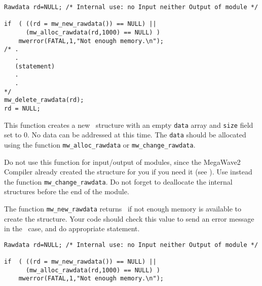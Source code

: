 \Next
\Example
\begin{verbatim}
Rawdata rd=NULL; /* Internal use: no Input neither Output of module */

if  ( ((rd = mw_new_rawdata()) == NULL) ||
      (mw_alloc_rawdata(rd,1000) == NULL) )
    mwerror(FATAL,1,"Not enough memory.\n");
/* .
   .
   (statement)
   .
   .
*/
mw_delete_rawdata(rd);
rd = NULL;

\end{verbatim}

\newpage %


\Description
This function creates a new \rawdata\ structure with an empty \verb+data+ array and
\verb+size+ field set to $0$.
No data can be addressed at this time.
The \verb+data+ should  be allocated using the function \verb+mw_alloc_rawdata+ or \verb+mw_change_rawdata+.

Do not use this function for input/output of modules, since the MegaWave2
Compiler already created the structure for you if you need it (see \volI). Use instead the function \verb+mw_change_rawdata+.
Do not forget to deallocate the internal structures before the end
of the module.

The function \verb+mw_new_rawdata+ returns \Null\ if not enough memory is available to create the structure. Your code should check this value to send an
error message in the \Null\ case, and do appropriate statement.

\Next
\Example
\begin{verbatim}
Rawdata rd=NULL; /* Internal use: no Input neither Output of module */

if  ( ((rd = mw_new_rawdata()) == NULL) ||
      (mw_alloc_rawdata(rd,1000) == NULL) )
    mwerror(FATAL,1,"Not enough memory.\n");
\end{verbatim}

\newpage %

